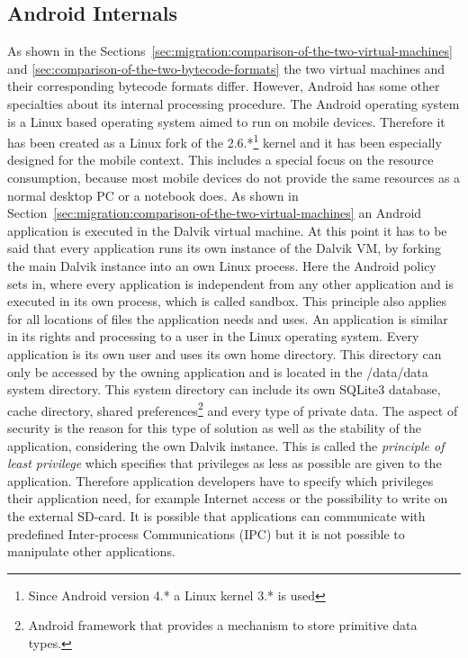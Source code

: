\subsection{Android Internals}
\label{sec:android-internals}
As shown in the Sections~\ref{sec:migration:comparison-of-the-two-virtual-machines} and \ref{sec:comparison-of-the-two-bytecode-formats} the two virtual machines and their corresponding bytecode formats differ.
However, Android has some other specialties about its internal processing procedure.
The Android operating system is a Linux based operating system aimed to run on mobile devices.
Therefore it has been created as a Linux fork of the 2.6.*\footnote{Since Android version 4.* a Linux kernel 3.* is used} kernel and it has been especially designed for the mobile context.
This includes a special focus on the resource consumption, because most mobile devices do not provide the same resources as a normal desktop PC or a notebook does.
As shown in Section~\ref{sec:migration:comparison-of-the-two-virtual-machines} an Android application is executed in the Dalvik virtual machine.
At this point it has to be said that every application runs its own instance of the Dalvik VM, by forking the main Dalvik instance into an own Linux process.
Here the Android policy sets in, where every application is independent from any other application and is executed in its own process, which is called sandbox.
This principle also applies for all locations of files the application needs and uses.
An application is similar in its rights and processing to a user in the Linux operating system.
Every application is its own user and uses its own home directory.
This directory can only be accessed by the owning application and is located in the /data/data system directory.
This system directory can include its own SQLite3 database, cache directory, shared preferences\footnote{Android framework that provides a mechanism to store primitive data types.} and every type of private data.
The aspect of security is the reason for this type of solution as well as the stability of the application, considering the own Dalvik instance.
This is called the \textit{principle of least privilege} which specifies that privileges as less as possible are given to the application.
Therefore application developers have to specify which privileges their application need, for example Internet access or the possibility to write on the external SD-card.
It is possible that applications can communicate with predefined Inter-process Communications (IPC) but it is not possible to manipulate other applications.
